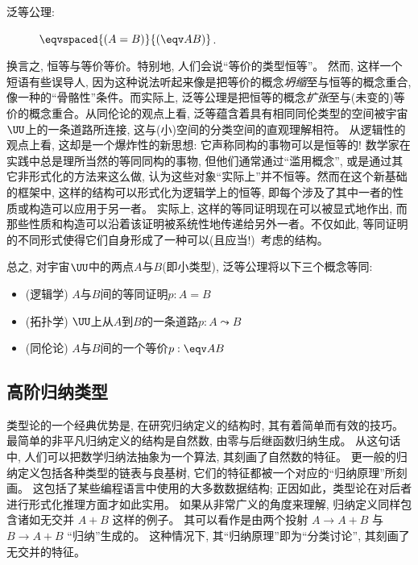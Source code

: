 \begin{description}%
\item[泛等公理:]  $\eqvspaced{(A = B)}{(\eqv A B)}$.
\end{description}
%
换言之, 恒等与等价等价。特别地, 人们会说``等价的类型恒等''。
然而, 这样一个短语有些误导人, 因为这种说法听起来像是把等价的概念\emph{坍缩}至与恒等的概念重合, 像一种的``骨骼性''条件。而实际上, 
泛等公理是把恒等的概念\emph{扩张}至与(未变的)等价的概念重合。从同伦论的观点上看, 泛等蕴含着具有相同同伦类型的空间被宇宙$\UU$上的一条道路所连接, 这与(小)空间的分类空间的直观理解相符。
从逻辑性的观点上看, 这却是一个爆炸性的新思想: 它声称同构的事物可以是恒等的! 数学家在实践中总是理所当然的等同同构的事物, 但他们通常通过``滥用概念'', 
或是通过其它非形式化的方法来这么做, 认为这些对象``实际上''并不恒等。然而在这个新基础的框架中, 这样的结构可以形式化为逻辑学上的恒等, 即每个涉及了其中一者的性质或构造可以应用于另一者。
实际上, 这样的等同证明现在可以被显式地作出, 而那些性质和构造可以沿着该证明被系统性地传递给另外一者。不仅如此, 等同证明的不同形式使得它们自身形成了一种可以(且应当!)\ 考虑的结构。

总之, 对宇宙$\UU$中的两点$A$与$B$(即小类型), 泛等公理将以下三个概念等同:
\begin{itemize}
\item (逻辑学) $A$与$B$间的等同证明$p:A=B$
\item (拓扑学) $\UU$上从$A$到$B$的一条道路$p:A \leadsto B$
\item (同伦论) $A$与$B$间的一个等价$p:\eqv A B$
\end{itemize}

\subsection*{高阶归纳类型}%

类型论的一个经典优势是, 在研究归纳定义的结构时, 其有着简单而有效的技巧。
最简单的非平凡归纳定义的结构是自然数, 由零与后继函数归纳生成。
从这句话中, 人们可以把数学归纳法抽象为一个算法, 其刻画了自然数的特征。
更一般的归纳定义包括各种类型的链表与良基树, 它们的特征都被一个对应的``归纳原理''所刻画。
这包括了某些编程语言中使用的大多数数据结构; 正因如此，类型论在对后者进行形式化推理方面才如此实用。
如果从非常广义的角度来理解, 归纳定义同样包含诸如无交并 $A+B$ 这样的例子。
其可以看作是由两个投射 $A \to A+B$ 与 $B \to A+B$ ``归纳''生成的。
这种情况下, 其``归纳原理''即为``分类讨论'', 其刻画了无交并的特征。

